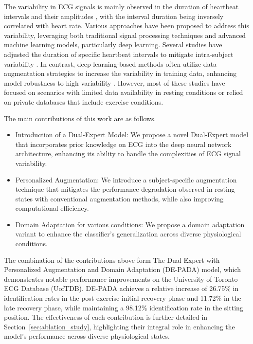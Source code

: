 The variability in ECG signals is mainly observed in the duration of heartbeat intervals and their amplitudes \cite{sornmo2005bioelectrical}, with the interval duration being inversely correlated with heart rate.
Various approaches have been proposed to address this variability, leveraging both traditional signal processing techniques and advanced machine learning models, particularly deep learning. Several studies have adjusted the duration of specific heartbeat intervals to mitigate intra-subject variability \cite{Hwang2021, heartID, Arteaga-Falconi2016, Choi2020, 5580317}. In contrast, deep learning-based methods often utilize data augmentation strategies to increase the variability in training data, enhancing model robustness to high variability \cite{8219706, Um_2017, Kim2022}.
However, most of these studies have focused on scenarios with limited data availability in resting conditions or relied on private databases that include exercise conditions.

The main contributions of this work are as follows.

\begin{itemize}

    \item Introduction of a Dual-Expert Model: We propose a novel Dual-Expert model that incorporates prior knowledge on ECG into the deep neural network architecture, enhancing its ability to handle the complexities of ECG signal variability.
    
    \item Personalized Augmentation: We introduce a subject-specific augmentation technique that mitigates the performance degradation observed in resting states with conventional augmentation methods, while also improving computational efficiency.
    
    \item Domain Adaptation for various conditions: We propose a domain adaptation variant to enhance the classifier’s generalization across diverse physiological conditions.

\end{itemize}

The combination of the contributions above form The Dual Expert with Personalized Augmentation and Domain Adaptation (DE-PADA) model, which demonstrates notable performance improvements on the University of Toronto ECG Database (UofTDB).
DE-PADA achieves a relative increase of 26.75\% in identification rates in the post-exercise initial recovery phase and 11.72\% in the late recovery phase, while maintaining a 98.12\% identification rate in the sitting position.
The effectiveness of each contribution is further detailed in Section~\ref{sec:ablation_study}, highlighting their integral role in enhancing the model's performance across diverse physiological states.